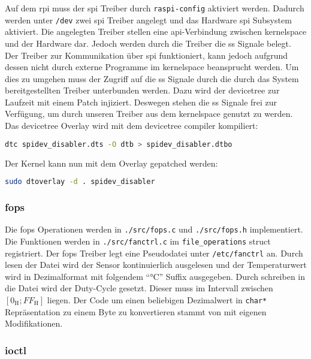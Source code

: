Auf dem \gls{rpi} muss der \gls{spi} Treiber durch \texttt{raspi-config} aktiviert werden.
Dadurch werden unter \texttt{/dev} zwei \gls{spi} Treiber angelegt und das Hardware \gls{spi} Subsystem aktiviert.
Die angelegten Treiber stellen eine \gls{api}-Verbindung zwischen \gls{kernelspace} und der Hardware dar.
Jedoch werden durch die Treiber die \gls{ss} Signale belegt.
Der Treiber zur Kommunikation über \gls{spi} funktioniert, kann jedoch aufgrund dessen nicht durch externe Programme im \gls{kernelspace} beansprucht werden.
Um dies zu umgehen muss der Zugriff auf die \gls{ss} Signale durch die durch das System bereitgestellten Treiber unterbunden werden.
Dazu wird der \gls{devicetree} zur Laufzeit mit einem Patch injiziert.
Deswegen stehen die \gls{ss} Signale frei zur Verfügung, um durch unseren Treiber aus dem \gls{kernelspace} genutzt zu werden.
Das \gls{devicetree} Overlay wird mit dem \gls{devicetree} compiler kompiliert:
\begin{lstlisting}[language=bash, numbers=none]
dtc spidev_disabler.dts -O dtb > spidev_disabler.dtbo
\end{lstlisting}
\noindent
Der Kernel kann nun mit dem Overlay gepatched werden:
\begin{lstlisting}[language=bash, numbers=none]
sudo dtoverlay -d . spidev_disabler
\end{lstlisting}

\subsubsection{\acrshort{fops}}

Die \gls{fops} Operationen werden in \texttt{./src/fops.c} und \texttt{./src/fops.h} implementiert.
Die Funktionen werden in \texttt{./src/fanctrl.c} im \texttt{file\_operations} struct registriert.
Der \gls{fops} Treiber legt eine Pseudodatei unter \texttt{/etc/fanctrl} an.
Durch lesen der Datei wird der Sensor kontinuierlich ausgelesen und der Temperaturwert wird in Dezimalformat mit folgendem \enquote{\si{\celsius}} Suffix ausgegeben.
Durch schreiben in die Datei wird der Duty-Cycle gesetzt.
Dieser muss im Intervall zwischen $\left[0_{\text{H}}; FF_{\text{H}}\right]$ liegen.
Der Code um einen beliebigen Dezimalwert in \texttt{char*} Repräsentation zu einem Byte zu konvertieren stammt von \autocite{toUint} mit eigenen Modifikationen.

\subsubsection{\Acrshort{ioctl}}

